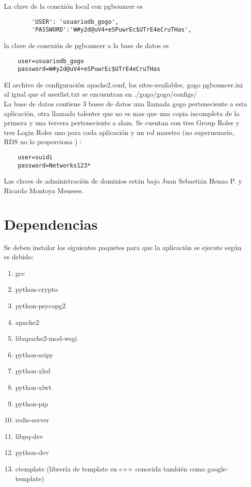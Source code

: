\documentclass[10pt,a4paper]{book}
\begin{document}
	La clave de la conexión local con pgbouncer es
	\begin{verbatim}
		'USER': 'usuariodb_gogo',
		'PASSWORD':'W#y2d@uV4+eSPuwrEc$UTrE4eCruTHas',
	\end{verbatim}

	la clave de conexión de pgbouncer a la base de datos es
	\begin{verbatim}
	user=usuariodb_gogo
	password=W#y2d@uV4+eSPuwrEc$UTrE4eCruTHas
	\end{verbatim}

	El archivo de configuración apache2.conf, los sites-availables, gogo pgbouncer.ini al igual que el userlist.txt se encuentran en ./gogo/gogo/configs/ \\

	La base de datos contiene 3 bases de datos una llamada gogo perteneciente a esta aplicación, otra llamada talenter que no es mas que una copia incompleta de la primera y una tercera perteneciente a slam. Se cuentan con tres Group Roles y tres Login Roles uno para cada aplicación y un rol maestro (no superusuario, RDS no lo proporciona ) :
	\begin{verbatim}
	user=suidi
	password=Networks123*
	\end{verbatim}

	Las claves de administración de dominios están bajo Juan Sebastián Henao P. y Ricardo Montoya Meneses.

	\section{Dependencias}

	Se deben instalar los siguientes paquetes para que la aplicación se ejecute según es debido:

	\begin{enumerate}
		\item gcc
		\item python-crypto
		\item python-psycopg2
		\item apache2
		\item libapache2-mod-wsgi
		\item python-scipy
		\item python-xlrd
		\item python-xlwt
		\item python-pip
		\item redis-server
		\item libpq-dev
		\item python-dev
		\item ctemplate (librería de template en c++ conocida también como google-template)
	\end{enumerate}
\end{document}
